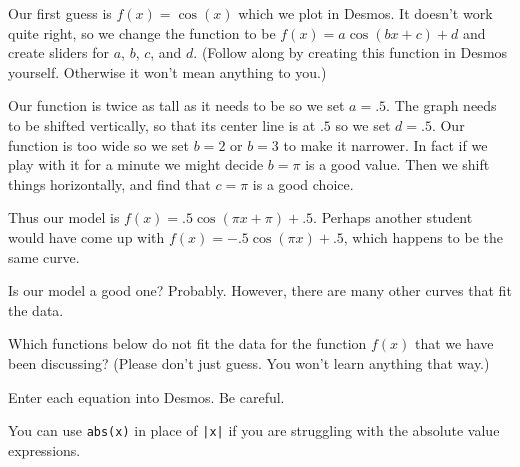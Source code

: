 \documentclass{ximera}
\begin{document}
Our first guess is $f(x)=\cos(x)$ which we plot in Desmos. It doesn't work quite right, so we change the function to be $f(x)=a\cos(bx+c)+d$ and create sliders for $a$, $b$, $c$, and $d$. (Follow along by creating this function in Desmos yourself. Otherwise it won't mean anything to you.)


Our function is twice as tall as it needs to be so we set $a=.5$. The graph needs to be shifted vertically, so that its center line is at $.5$ so we set $d=.5$. Our function is too wide so we set $b=2$ or $b=3$ to make it narrower. In fact if we play with it for a minute we might decide $b=\pi$ is a good value. Then we shift things horizontally, and find that $c=\pi$ is a good choice.

Thus our model is $f(x)=.5\cos(\pi x+\pi)+.5$. Perhaps another student would have come up with $f(x)=-.5\cos(\pi x)+.5$, which happens to be the same curve. 

Is our model a good one? Probably. However, there are many other curves that fit the data.

\begin{question}
Which functions below do not fit the data for the function $f(x)$ that we have been discussing? (Please don't just guess. You won't learn anything that way.)
  \begin{solution}
    \begin{multiple-choice}
    \end{multiple-choice}
    \begin{hint}
    Enter each equation into Desmos. Be careful. 
    \end{hint}
    \begin{hint}
    You can use \verb|abs(x)| in place of \verb+|x|+ if you are struggling with the absolute value expressions. 
    \end{hint}
  \end{solution}
\end{question}
\end{document}
